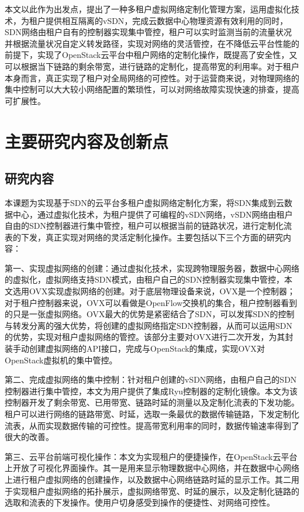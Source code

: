 本文以此作为出发点，提出了一种多租户虚拟网络定制化管理方案，运用虚拟化技术，为租户提供相互隔离的\gls*{vSDN}，完成云数据中心物理资源有效利用的同时，SDN网络由租户自有的控制器实现集中管控，租户可以实时监测当前的流量状况并根据流量状况自定义转发路径，实现对网络的灵活管控，在不降低云平台性能的前提下，实现了OpenStack云平台中租户网络的定制化操作，既提高了安全性，又可以根据当下链路的剩余带宽，进行链路的定制化，提高带宽的利用率。对于租户本身而言，真正实现了租户对全局网络的可控性。对于运营商来说，对物理网络的集中控制可以大大较小网络配置的繁琐性，可以对网络故障实现快速的排查，提高可扩展性。

\section{主要研究内容及创新点}
\subsection{研究内容}
本课题为实现基于SDN的云平台多租户虚拟网络定制化方案，将SDN集成到云数据中心，通过虚拟化技术，为租户提供了可编程的vSDN网络，vSDN网络由租户自由的SDN控制器进行集中管控，租户可以根据当前的链路状况，进行定制化流表的下发，真正实现对网络的灵活定制化操作。主要包括以下三个方面的研究内容：

第一、实现虚拟网络的创建：通过虚拟化技术，实现跨物理服务器，数据中心网络的虚拟化，虚拟网络支持SDN模式，由租户自己的SDN控制器实现集中管控，本文选用\gls*{OVX}\cite{OVX-1}实现虚拟网络的创建。对于底层物理设备来说，OVX是一个控制器；对于租户控制器来说，OVX可以看做是OpenFlow交换机的集合，租户控制器看到的只是一张虚拟网络。OVX最大的优势是紧密结合了SDN，可以发挥SDN的控制与转发分离的强大优势，将创建的虚拟网络指定SDN控制器，从而可以运用SDN的优势，实现对租户虚拟网络的管控。该部分主要对OVX进行二次开发，为其封装手动创建虚拟网络的API接口，完成与OpenStack的集成，实现OVX对OpenStack虚拟机的集中管控。

第二、完成虚拟网络的集中控制：针对租户创建的vSDN网络，由租户自己的SDN控制器进行集中管控，本文为用户提供了集成Ryu控\cite{Ryu-1}制器的定制化镜像。本文为该控制器开发了剩余带宽、已用带宽、链路时延的测量以及定制化流表的下发功能。租户可以进行网络的链路带宽、时延，选取一条最优的数据传输链路，下发定制化流表，从而实现数据传输的可控性。提高带宽利用率的同时，数据传输速率得到了很大的改善。

第三、云平台前端可视化操作：本文为实现租户的便捷操作，在OpenStack云平台上开放了可视化界面操作。其一是用来显示物理数据中心网络，并在数据中心网络上进行租户虚拟网络的创建操作，以及数据中心网络链路时延的显示工作。其二用于实现租户虚拟网络的拓扑展示，虚拟网络带宽、时延的展示，以及定制化链路的选取和流表的下发操作。使用户切身感受到操作的便捷性、对网络可控性。

